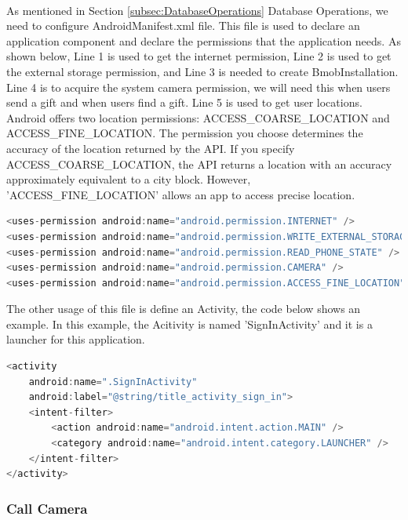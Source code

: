 \paragraph{} As mentioned in Section \ref{subsec:DatabaseOperations} Database Operations, we need to configure AndroidManifest.xml file. This file is used to declare an application component and declare the permissions that the application needs. As shown below, Line 1 is used to get the internet permission, Line 2 is used to get the external storage permission, and Line 3 is needed to create BmobInstallation. Line 4 is to acquire the system camera permission, we will need this when users send a gift and when users find a gift. Line 5 is used to get user locations. Android offers two location permissions: ACCESS\_COARSE\_LOCATION and ACCESS\_FINE\_LOCATION. The permission you choose determines the accuracy of the location returned by the API. If you specify ACCESS\_COARSE\_LOCATION, the API returns a location with an accuracy approximately equivalent to a city block. However, 'ACCESS\_FINE\_LOCATION' allows an app to access precise location.
\begin{lstlisting}[language=JAVA] 
<uses-permission android:name="android.permission.INTERNET" />
<uses-permission android:name="android.permission.WRITE_EXTERNAL_STORAGE" />
<uses-permission android:name="android.permission.READ_PHONE_STATE" />
<uses-permission android:name="android.permission.CAMERA" />
<uses-permission android:name="android.permission.ACCESS_FINE_LOCATION" />
\end{lstlisting} 
\par The other usage of this file is define an Activity, the code below shows an example. In this example, the Acitivity is named 'SignInActivity' and it is a launcher for this application.
\begin{lstlisting}[language=JAVA] 
<activity
    android:name=".SignInActivity"
    android:label="@string/title_activity_sign_in">
    <intent-filter>
        <action android:name="android.intent.action.MAIN" />
        <category android:name="android.intent.category.LAUNCHER" />
    </intent-filter>
</activity>
\end{lstlisting} 

\subsubsection{Call Camera}

